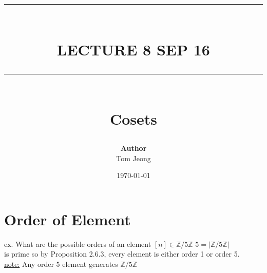 \documentclass{article}
\newcommand{\HRule}[1]{\rule{\linewidth}{#1}}
\begin{document}

\title{ \normalsize \textsc{}
		\\ [2.0cm]
		\HRule{1.5pt} \\
		\LARGE \textbf{\uppercase{Lecture 8 sep 16}}
		\HRule{2.0pt} \\ [0.6cm] \LARGE{Cosets}
		}

\date{\today}
\author{\textbf{Author} \\ 
		Tom Jeong
        }

\maketitle
\newpage

\tableofcontents
\newpage

\section{Order of Element}
ex. What are the possible orders of an element $[n] \in \mathbb{Z} / 5\mathbb{Z}$ 
$5 = | \mathbb{Z} / 5\mathbb{Z} |$ \\is prime so by Proposition 2.6.3, every element is either order 1 or order 5. \\ \underline{note:} Any order 5 element generates $\mathbb{Z} / 5\mathbb{Z}$
\end{document}
